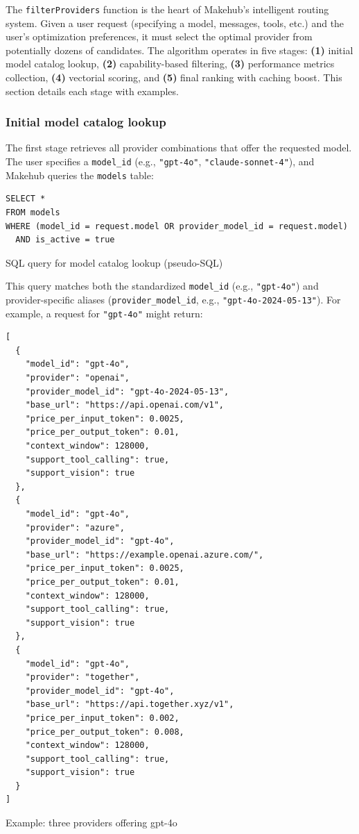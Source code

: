 \documentclass[english]{article}
\begin{document}
The \texttt{filterProviders} function is the heart of Makehub's intelligent routing system. Given a user request (specifying a model, messages, tools, etc.) and the user's optimization preferences, it must select the optimal provider from potentially dozens of candidates. The algorithm operates in five stages: \textbf{(1)} initial model catalog lookup, \textbf{(2)} capability-based filtering, \textbf{(3)} performance metrics collection, \textbf{(4)} vectorial scoring, and \textbf{(5)} final ranking with caching boost. This section details each stage with examples.

\subsubsection{Initial model catalog lookup}

The first stage retrieves all provider combinations that offer the requested model. The user specifies a \texttt{model\_id} (e.g., \texttt{"gpt-4o"}, \texttt{"claude-sonnet-4"}), and Makehub queries the \texttt{models} table:

\begin{listing}[H]
\begin{verbatim}
SELECT *
FROM models
WHERE (model_id = request.model OR provider_model_id = request.model)
  AND is_active = true
\end{verbatim}
\caption{SQL query for model catalog lookup (pseudo-SQL)}
\end{listing}

This query matches both the standardized \texttt{model\_id} (e.g., \texttt{"gpt-4o"}) and provider-specific aliases (\texttt{provider\_model\_id}, e.g., \texttt{"gpt-4o-2024-05-13"}). For example, a request for \texttt{"gpt-4o"} might return:

\begin{listing}[H]
\begin{verbatim}
[
  {
    "model_id": "gpt-4o",
    "provider": "openai",
    "provider_model_id": "gpt-4o-2024-05-13",
    "base_url": "https://api.openai.com/v1",
    "price_per_input_token": 0.0025,
    "price_per_output_token": 0.01,
    "context_window": 128000,
    "support_tool_calling": true,
    "support_vision": true
  },
  {
    "model_id": "gpt-4o",
    "provider": "azure",
    "provider_model_id": "gpt-4o",
    "base_url": "https://example.openai.azure.com/",
    "price_per_input_token": 0.0025,
    "price_per_output_token": 0.01,
    "context_window": 128000,
    "support_tool_calling": true,
    "support_vision": true
  },
  {
    "model_id": "gpt-4o",
    "provider": "together",
    "provider_model_id": "gpt-4o",
    "base_url": "https://api.together.xyz/v1",
    "price_per_input_token": 0.002,
    "price_per_output_token": 0.008,
    "context_window": 128000,
    "support_tool_calling": true,
    "support_vision": true
  }
]
\end{verbatim}
\caption{Example: three providers offering gpt-4o}
\end{listing}
\end{document}
